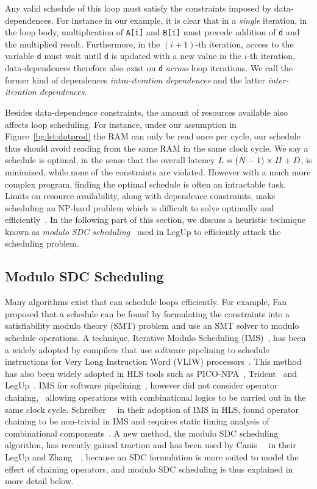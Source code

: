 Any valid schedule of this loop must satisfy the constraints imposed by
data-dependences.  For instance in our example, it is clear that in a
\emph{single} iteration, in the loop body, multiplication of \verb|A[i]|
and \verb|B[i]| must precede addition of \verb|d| and the multiplied
result.  Furthermore, in the $(i + 1)$-th iteration, access to the variable
\verb|d| must wait until \verb|d| is updated with a new value in the $i$-th
iteration, data-dependences therefore also exist on \verb|d| \emph{across}
loop iterations.  We call the former kind of dependences \emph{intra-iteration
dependences} and the latter \emph{inter-iteration dependences}.

Besides data-dependence constraints, the amount of resources available
also affects loop scheduling.  For instance, under our assumption in
Figure~\ref{bg:lst:dotprod} the RAM can only be read once per cycle, our
schedule thus should avoid reading from the same RAM in the same clock cycle.
We say a schedule is optimal, in the sense that the overall latency $L = (N -
1) \times \mathit{II} + D$, is minimized, while none of the constraints are violated.
However with a much more complex program, finding the optimal schedule is
often an intractable task.  Limits on resource availability, along with
dependence constraints, make scheduling an NP-hard problem which is difficult
to solve optimally and efficiently~\cite{hwang91}.  In the following part
of this section, we discuss a heuristic technique known as \emph{modulo SDC
scheduling}~\cite{zhang13, canis14} used in LegUp to efficiently attack the
scheduling problem.


\subsection{Modulo SDC Scheduling}
\label{bg:sub:modulo_sdc_scheduling}

Many algorithms exist that can schedule loops efficiently.  For example,
Fan~\etal~\cite{fan08} proposed that a schedule can be found by formulating
the constraints into a satisfiability modulo theory (SMT) problem and use
an SMT solver to modulo schedule operations.  A technique, Iterative Modulo
Scheduling (IMS)~\cite{rau94}, has been a widely adopted by compilers that use
software pipelining to schedule instructions for Very Long Instruction Word
(VLIW) processors~\cite{mcnairy03}.  This method has also been widely adopted
in HLS tools such as PICO-NPA~\cite{schreiber02}, Trident~\cite{tripp05} and
LegUp~\cite{canis13, canis14}.  IMS for software pipelining~\cite{rau94},
however did not consider operator chaining, \ie~allowing operations
with combinational logics to be carried out in the same clock cycle.
Schreiber~\etal~\cite{schreiber02} in their adoption of IMS in HLS, found
operator chaining to be non-trivial in IMS and requires static timing analysis
of combinational components~\cite{canis14}.  A new method, the modulo SDC
scheduling algorithm, has recently gained traction and has been used by
Canis~\etal~\cite{canis14} in their LegUp and Zhang~\etal~\cite{zhang13},
because an SDC formulation is more suited to model the effect of chaining
operators, and modulo SDC scheduling is thus explained in more detail below.

